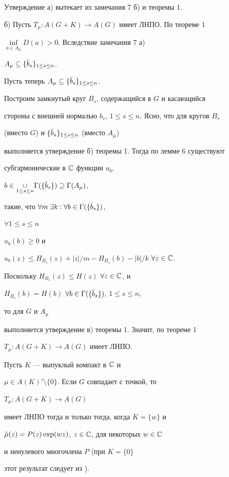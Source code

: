 \begin{pf} Утверждение а) вытекает из замечания 7 б) и теоремы 1. 


 


б) Пусть $T_\mu :A(G+K)\to A(G)$ имеет ЛНПО. По теореме 1 


$\inf\limits_{a\in A_\mu}D(a)>0$. Вследствие замечания 7 а) 


$A_\mu\subseteq\{\Bar b_s\}_{1\le s\le n}$. 


\medskip


 


Пусть теперь $A_\mu\subseteq\{\Bar b_s\}_{1\le s\le n}$. 


Построим замкнутый круг $B_s$, содержащийся в $G$ и касающийся 


стороны с внешней нормалью $b_s$, $1\le s\le n$. Ясно, что для кругов $B_s$ 


(вместо $G$) и $\{\Bar b_s\}_{1\le s\le n}$ (вместо $A_\mu$) 


выполняется утверждение б) теоремы 1. Тогда по лемме 6 существуют 


субгармонические в $\Bbb C$ функции $u_b$, 


$b\in\underset{1\le s\le n}{\cup}\Gamma(\{\Bar b_s\})\supseteq\Gamma(A_\mu)$, 


такие, что $\forall m\;\exists k:\forall b\in\Gamma(\{\Bar b_s\})$,


$\forall 1\le s\le n$


$u_b(b)\ge 0$ и


$u_b(z)\le H_{B_s}(z)+|z|/m-H_{B_s}(b)-|b|/k$ $\forall z\in\Bbb C$. 


Поскольку $H_{B_s}(z)\le H(z)$ $\forall z\in\Bbb C$, и 


$H_{B_s}(b)=H(b)$ $\forall b\in\Gamma(\{\Bar b_s\})$, $1\le s\le n$, 


то для $G$ и $A_\mu$ 


выполняется утверждение в) теоремы 1. Значит, по теореме 1 


$T_\mu :A(G+K)\to A(G)$ имеет ЛНПО. 


\end{pf} 


 


\begin{note} Пусть $K$ --- выпуклый компакт в $\Bbb C$ и 


$\mu\in A(K)'\setminus\{0\}$. Если $G$ совпадает с точкой, то 


$T_\mu :A(G+K)\to A(G)$ 


имеет ЛНПО тогда и только тогда, когда $K=\{w\}$ и 


$\Hat\mu(z)=P(z)\exp(wz)$, $z\in\Bbb C$, для некоторых $w\in\Bbb C$ 


и ненулевого многочлена $P$ (при $K=\{0\}$ 


этот результат следует из \cite{Mei1}). 


\end{note} 


